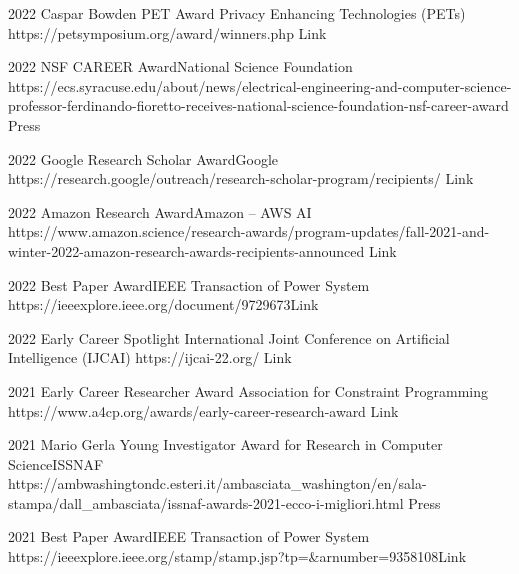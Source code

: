 \documentclass[localFont,alternative]{documentMETADATA}
\begin{document}
\begin{awards}
	\awardentry
	{2022}
	{Caspar Bowden PET Award}%
	{Privacy Enhancing Technologies (PETs)}
	{https://petsymposium.org/award/winners.php}
	{Link}

	\awardentry
	{2022}
	{NSF CAREER Award}{National Science Foundation}
	{https://ecs.syracuse.edu/about/news/electrical-engineering-and-computer-science-professor-ferdinando-fioretto-receives-national-science-foundation-nsf-career-award}
	{Press}

	\awardentry
	{2022}
	{Google Research Scholar Award}{Google}
	{https://research.google/outreach/research-scholar-program/recipients/}
	{Link}

	\awardentry
	{2022}
	{Amazon Research Award}{Amazon -- AWS AI}
	{https://www.amazon.science/research-awards/program-updates/fall-2021-and-winter-2022-amazon-research-awards-recipients-announced}
	{Link}

	\awardentry
	{2022}
	{Best Paper Award}{IEEE Transaction of Power System}
	{https://ieeexplore.ieee.org/document/9729673}{Link}

	\awardentry
	{2022}
	{Early Career Spotlight}%
	{International Joint Conference on Artificial Intelligence (IJCAI)}
	{https://ijcai-22.org/}
	{Link}

	\awardentry
	{2021}
	{Early Career Researcher Award}
	{Association for Constraint Programming}
	{https://www.a4cp.org/awards/early-career-research-award}
	{Link}

	\awardentry
	{2021}
	{Mario Gerla Young Investigator Award for Research in Computer Science}{ISSNAF}
	{https://ambwashingtondc.esteri.it/ambasciata_washington/en/sala-stampa/dall_ambasciata/issnaf-awards-2021-ecco-i-migliori.html}
	{Press}

		
	\awardentry
	{2021}
	{Best Paper Award}{IEEE Transaction of Power System}
	{https://ieeexplore.ieee.org/stamp/stamp.jsp?tp=\&arnumber=9358108}{Link}


\end{awards}
\end{document}
